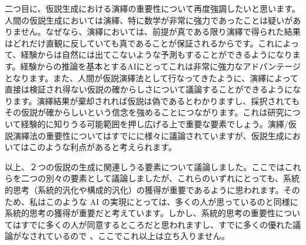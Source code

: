 二つ目に、仮説生成における演繹の重要性について再度強調したいと思います。人間の仮説生成においては演繹、特に数学が非常に強力であったことは疑いがありません。なぜなら、演繹においては、前提が真である限り演繹で得られた結果はどれだけ直観に反していても真であることが保証されるからです。これによって、経験からは自然には出てこないような予測もすることができるようになります。経験からの推論を基本とするAIにとってこれは非常に強力なアドバンテージとなります。また、人間が仮説演繹法として行なってきたように、演繹によって直接は検証され得ない仮説の確からしさについて議論することができるようになります。演繹結果が棄却されれば仮説は偽であるとわかりますし、採択されてもその仮説が確からしいという信念を強めることにつながります。これは研究について経験的に知りうる可能範囲を押し広げる上で重要な要素でしょう。演繹/仮説演繹法の重要性についてはすでにに様々に議論されていますが、仮説生成においてはこのような利点があると考えられます。

以上、２つの仮説の生成に関連しうる要素について議論しました。ここではこれらを二つの別々の要素として議論しましたが、これらのいずれにとっても、系統的思考（系統的汎化や構成的汎化）の獲得が重要であるように思われます。そのため、私はこのような AI の実現にとっては、多くの人が思っているのと同様に系統的思考の獲得が重要だと考えています。しかし、系統的思考の重要性についてはすでに多くの人が同意するところだと思われますし、すでに多くの優れた議論がなされているので \cite{goyal2022inductive}、ここでこれ以上は立ち入りません。





